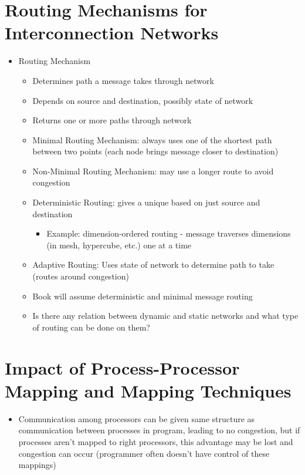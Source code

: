 \documentclass[a4paper]{article}
\begin{document}
\section{Routing Mechanisms for Interconnection Networks}
\begin{itemize}
  \item Routing Mechanism
    \begin{itemize}
      \item Determines path a message takes through network
      \item Depends on source and destination, possibly state of network
      \item Returns one or more paths through network
      \item Minimal Routing Mechanism: always uses one of the shortest path between two points (each node brings message closer to destination)
      \item Non-Minimal Routing Mechanism: may use a longer route to avoid congestion
      \item Deterministic Routing: gives a unique based on just source and destination
        \begin{itemize}
          \item Example: dimension-ordered routing - message traverses dimensions (in mesh, hypercube, etc.) one at a time
        \end{itemize}
      \item Adaptive Routing: Uses state of network to determine path to take (routes around congestion)
      \item Book will assume deterministic and minimal message routing
      \item \color{red} Is there any relation between dynamic and static networks and what type of routing can be done on them?
    \end{itemize}
\end{itemize}

\section{Impact of Process-Processor Mapping and Mapping Techniques}
\begin{itemize}
  \item Communication among processors can be given same structure as communication between processes in program, leading to no congestion, but if
    processes aren't mapped to right processors, this advantage may be lost and congestion can occur (programmer often doesn't have control of these
    mappings)
\end{itemize}
\end{document}
